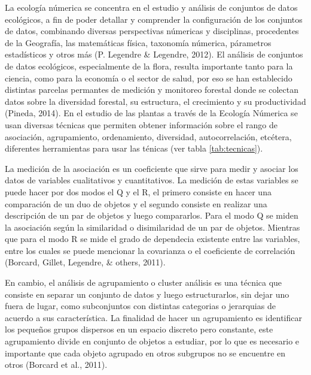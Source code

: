 \documentclass[11pt,]{article}
\begin{document}
La ecología númerica se concentra en el estudio y análisis de conjuntos
de datos ecológicos, a fin de poder detallar y comprender la
configuración de los conjuntos de datos, combinando diversas
perspectivas númericas y disciplinas, procedentes de la Geografía, las
matemáticas física, taxonomía númerica, párametros estadísticos y otros
más (P. Legendre \& Legendre, 2012). El análisis de conjuntos de datos
ecológicos, especialmente de la flora, resulta importante tanto para la
ciencia, como para la economía o el sector de salud, por eso se han
establecido distintas parcelas permantes de medición y monitoreo
forestal donde se colectan datos sobre la diversidad forestal, su
estructura, el crecimiento y su productividad (Pineda, 2014). En el
estudio de las plantas a través de la Ecología Númerica se usan diversas
técnicas que permiten obtener información sobre el rango de asociación,
agrupamiento, ordenamiento, diversidad, autocorrelación, etcétera,
diferentes herramientas para usar las ténicas (ver tabla
\ref{tab:tecnicas}).

La medición de la asociación es un coeficiente que sirve para medir y
asociar los datos de variables cualitativos y cuantitativos. La medición
de estas variables se puede hacer por dos modos el Q y el R, el primero
consiste en hacer una comparación de un duo de objetos y el segundo
consiste en realizar una descripción de un par de objetos y luego
compararlos. Para el modo Q se miden la asociación según la similaridad
o disimilaridad de un par de objetos. Mientras que para el modo R se
mide el grado de dependecia existente entre las variables, entre los
cuales se puede mencionar la covarianza o el coeficiente de correlación
(Borcard, Gillet, Legendre, \& others, 2011).

En cambio, el análisis de agrupamiento o cluster análisis es una técnica
que consiste en separar un conjunto de datos y luego estructurarlos, sin
dejar uno fuera de lugar, como subconjuntos con distintas categorias o
jerarquias de acuerdo a sus característica. La finalidad de hacer un
agrupamiento es identificar los pequeños grupos dispersos en un espacio
discreto pero constante, este agrupamiento divide en conjunto de objetos
a estudiar, por lo que es necesario e importante que cada objeto
agrupado en otros subgrupos no se encuentre en otros (Borcard et al.,
2011).
\end{document}
